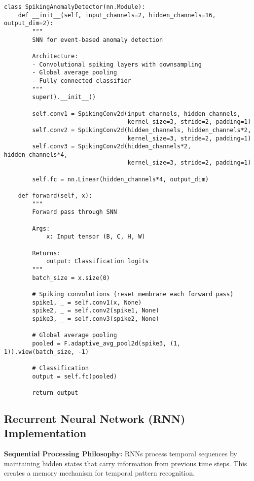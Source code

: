 \documentclass[12pt,a4paper]{article}
\begin{document}
\begin{lstlisting}[caption={SNN Anomaly Detector - Complete Bio-Inspired Architecture}]
class SpikingAnomalyDetector(nn.Module):
    def __init__(self, input_channels=2, hidden_channels=16, output_dim=2):
        """
        SNN for event-based anomaly detection

        Architecture:
        - Convolutional spiking layers with downsampling
        - Global average pooling
        - Fully connected classifier
        """
        super().__init__()

        self.conv1 = SpikingConv2d(input_channels, hidden_channels,
                                   kernel_size=3, stride=2, padding=1)
        self.conv2 = SpikingConv2d(hidden_channels, hidden_channels*2,
                                   kernel_size=3, stride=2, padding=1)
        self.conv3 = SpikingConv2d(hidden_channels*2, hidden_channels*4,
                                   kernel_size=3, stride=2, padding=1)

        self.fc = nn.Linear(hidden_channels*4, output_dim)

    def forward(self, x):
        """
        Forward pass through SNN

        Args:
            x: Input tensor (B, C, H, W)

        Returns:
            output: Classification logits
        """
        batch_size = x.size(0)

        # Spiking convolutions (reset membrane each forward pass)
        spike1, _ = self.conv1(x, None)
        spike2, _ = self.conv2(spike1, None)
        spike3, _ = self.conv3(spike2, None)

        # Global average pooling
        pooled = F.adaptive_avg_pool2d(spike3, (1, 1)).view(batch_size, -1)

        # Classification
        output = self.fc(pooled)

        return output
\end{lstlisting}

\subsection{Recurrent Neural Network (RNN) Implementation}

\textbf{Sequential Processing Philosophy:} RNNs process temporal sequences by maintaining hidden states that carry information from previous time steps. This creates a memory mechanism for temporal pattern recognition.
\end{document}

